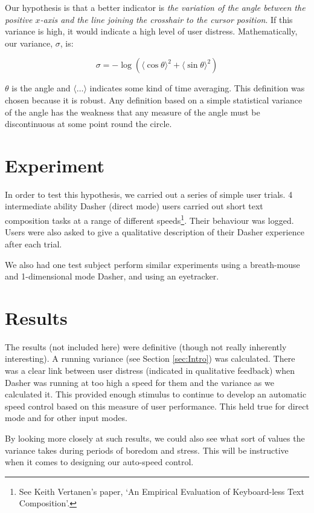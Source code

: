 \documentclass[a4paper,11pt,notitlepage]{article}
\begin{document}
Our hypothesis is that a better indicator is \emph{the variation of
the angle between the positive $x$-axis and the line joining the
crosshair to the cursor position}. If this variance is high, it would
indicate a high level of user distress. Mathematically, our variance,
$\sigma$, is:

\begin{equation}\label{equ:var}
\sigma=-\log{\left( \langle \cos \theta \rangle^2 + \langle \sin \theta \rangle^2 \right)}
\end{equation}

$\theta$ is the angle and $\langle\ldots\rangle$ indicates some kind
of time averaging. This definition was chosen because it is
robust. Any definition based on a simple statistical variance of the
angle has the weakness that any measure of the angle must be
discontinuous at some point round the circle.

\section{Experiment}

In order to test this hypothesis, we carried out a series of simple
user trials. 4 intermediate ability Dasher (direct mode) users carried
out short text composition tasks at a range of different
speeds\footnote{See Keith Vertanen's paper, `An Empirical Evaluation
of Keyboard-less Text Composition'.}. Their behaviour was
logged. Users were also asked to give a qualitative description of
their Dasher experience after each trial.

We also had one test subject perform similar experiments using a
breath-mouse and 1-dimensional mode Dasher, and using an eyetracker.

\section{Results}

The results (not included here) were definitive (though not really
inherently interesting). A running variance (see
Section \ref{sec:Intro}) was calculated. There was a clear link between
user distress (indicated in qualitative feedback) when Dasher was
running at too high a speed for them and the variance as we calculated
it. This provided enough stimulus to continue to develop an automatic
speed control based on this measure of user performance. This held
true for direct mode and for other input modes.

By looking more closely at such results, we could also see what sort
of values the variance takes during periods of boredom and
stress. This will be instructive when it comes to designing our
auto-speed control.
\end{document}
